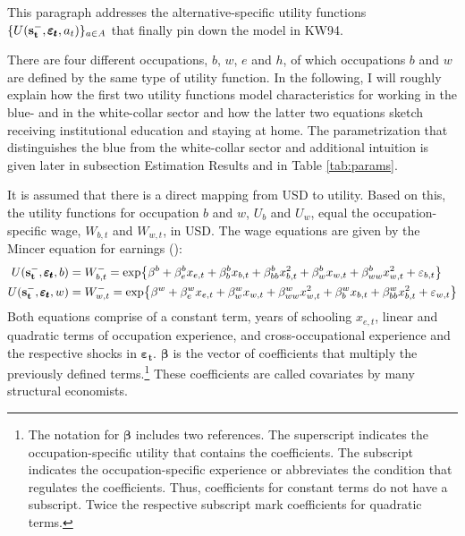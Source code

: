 \noindent
This paragraph addresses the alternative-specific utility functions $\{U(\bold{s_t^-}, \pmb{\varepsilon_t},a_t)\}_{a \in A}$ that finally pin down the model in KW94.

There are four different occupations, $b$, $w$, $e$ and $h$, of which occupations $b$ and $w$ are defined by the same type of utility function. In the following, I will roughly explain how the first two utility functions model characteristics for working in the blue- and in the white-collar sector and how the latter two equations sketch receiving institutional education and staying at home. The parametrization that distinguishes the blue from the white-collar sector and additional intuition is given later in subsection Estimation Results and in Table \ref{tab:params}.

It is assumed that there is a direct mapping from USD to utility. Based on this, the utility functions for occupation $b$ and $w$, $U_b$ and $U_w$, equal the occupation-specific wage, $W_{b,t}$ and $W_{w,t}$, in USD. The wage equations are given by the Mincer equation for earnings (\cite{Mincer.1958}):
\begin{equation} \label{eq:returns_b_w}
\begin{aligned}
U(\bold{s_t^-}, \pmb{\varepsilon_t},b) &= W_{b,t}^{-} = \text{exp}\big\{\beta^b + \beta_e^b x_{e,t} + \beta_b^b x_{b,t} + \beta_{bb}^b x^2_{b,t} + \beta_w^b x_{w,t} + \beta_{ww}^{b} x^2_{w,t} + \varepsilon_{b,t}\big\} \\
U(\bold{s_t^-},\pmb{\varepsilon_t},w) &= W_{w,t}^{-} = \text{exp}\big\{\beta^w + \beta_e^w x_{e,t} + \beta_w^w x_{w,t} + \beta_{ww}^w x^2_{w,t} + \beta_b^w x_{b,t} + \beta_{bb}^{w} x^2_{b,t} + \varepsilon_{w,t}\big\}
\end{aligned}
\end{equation}
\newline
Both equations comprise of a constant term, years of schooling $x_{e,t}$, linear and quadratic terms of occupation experience, and cross-occupational experience and the  respective shocks in $\pmb{\varepsilon_{t}}$. $\pmb{\beta}$ is the vector of coefficients that multiply the previously defined terms.\footnote{The notation for $\pmb{\beta}$ includes two references. The superscript indicates the occupation-specific utility that contains the coefficients. The subscript indicates the occupation-specific experience or abbreviates the condition that regulates the coefficients. Thus, coefficients for constant terms do not have a subscript. Twice the respective subscript mark coefficients for quadratic terms.} These coefficients are called covariates by many structural economists.

